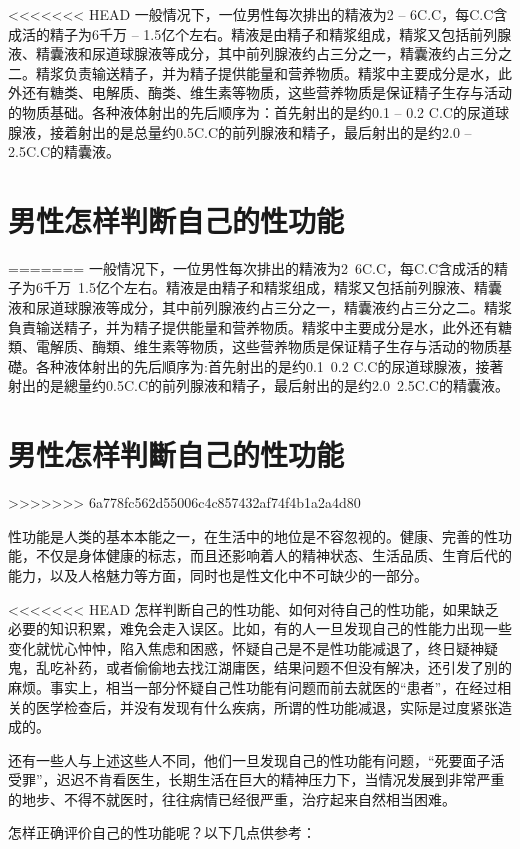 \documentclass[12pt,UTF8]{ctexbook}
\begin{document}
<<<<<<< HEAD
一般情况下，一位男性每次排出的精液为2 -- 6C.C，每C.C含成活的精子为6千万 -- 1.5亿个左右。精液是由精子和精浆组成，精浆又包括前列腺液、精囊液和尿道球腺液等成分，其中前列腺液约占三分之一，精囊液约占三分之二。精浆负责输送精子，并为精子提供能量和营养物质。精浆中主要成分是水，此外还有糖类、电解质、酶类、维生素等物质，这些营养物质是保证精子生存与活动的物质基础。各种液体射出的先后顺序为：首先射出的是约0.1 -- 0.2 C.C的尿道球腺液，接着射出的是总量约0.5C.C的前列腺液和精子，最后射出的是约2.0 -- 2.5C.C的精囊液。

\section{男性怎样判断自己的性功能}
=======
一般情况下，一位男性每次排出的精液为2~6C.C，每C.C含成活的精子为6千万~1.5亿个左右。精液是由精子和精浆组成，精浆又包括前列腺液、精囊液和尿道球腺液等成分，其中前列腺液约占三分之一，精囊液约占三分之二。精浆負責输送精子，并为精子提供能量和营养物质。精浆中主要成分是水，此外还有糖類、電解质、酶類、维生素等物质，这些营养物质是保证精子生存与活动的物质基礎。各种液体射出的先后順序为:首先射出的是约0.1~0.2 C.C的尿道球腺液，接著射出的是總量约0.5C.C的前列腺液和精子，最后射出的是约2.0~2.5C.C的精囊液。

\section{男性怎样判斷自己的性功能}
>>>>>>> 6a778fc562d55006c4c857432af74f4b1a2a4d80

性功能是人类的基本本能之一，在生活中的地位是不容忽视的。健康、完善的性功能，不仅是身体健康的标志，而且还影响着人的精神状态、生活品质、生育后代的能力，以及人格魅力等方面，同时也是性文化中不可缺少的一部分。

<<<<<<< HEAD
怎样判断自己的性功能、如何对待自己的性功能，如果缺乏必要的知识积累，难免会走入误区。比如，有的人一旦发现自己的性能力出现一些变化就忧心忡忡，陷入焦虑和困惑，怀疑自己是不是性功能减退了，终日疑神疑鬼，乱吃补药，或者偷偷地去找江湖庸医，结果问题不但没有解决，还引发了別的麻烦。事实上，相当一部分怀疑自己性功能有问题而前去就医的“患者”，在经过相关的医学检查后，并没有发现有什么疾病，所谓的性功能减退，实际是过度紧张造成的。

还有一些人与上述这些人不同，他们一旦发现自己的性功能有问题，“死要面子活受罪”，迟迟不肯看医生，长期生活在巨大的精神压力下，当情况发展到非常严重的地步、不得不就医时，往往病情已经很严重，治疗起来自然相当困难。

怎样正确评价自己的性功能呢？以下几点供参考：
\end{document}
